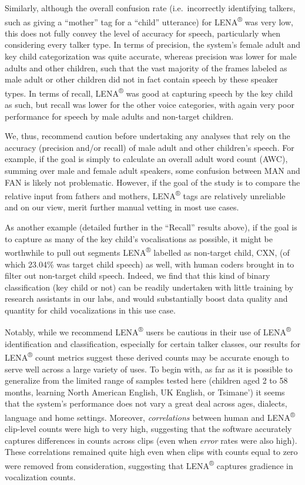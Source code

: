 \documentclass[english,table,man,floatsintext]{apa6}
\begin{document}
Similarly, although the overall confusion rate (i.e.~incorrectly
identifying talkers, such as giving a \enquote{mother} tag for a
\enquote{child} utterance) for LENA\textsuperscript{®} was very low,
this does not fully convey the level of accuracy for speech,
particularly when considering every talker type. In terms of precision,
the system's female adult and key child categorization was quite
accurate, whereas precision was lower for male adults and other
children, such that the vast majority of the frames labeled as male
adult or other children did not in fact contain speech by these speaker
types. In terms of recall, LENA\textsuperscript{®} was good at capturing
speech by the key child as such, but recall was lower for the other
voice categories, with again very poor performance for speech by male
adults and non-target children.

We, thus, recommend caution before undertaking any analyses that rely on
the accuracy (precision and/or recall) of male adult and other
children's speech. For example, if the goal is simply to calculate an
overall adult word count (AWC), summing over male and female adult
speakers, some confusion between MAN and FAN is likely not problematic.
However, if the goal of the study is to compare the relative input from
fathers and mothers, LENA\textsuperscript{®} tags are relatively
unreliable and on our view, merit further manual vetting in most use
cases.

As another example (detailed further in the \enquote{Recall} results
above), if the goal is to capture as many of the key child's
vocalisations as possible, it might be worthwhile to pull out segments
LENA\textsuperscript{®} labelled as non-target child, CXN, (of which
23.04\% was target child speech) as well, with human coders brought in
to filter out non-target child speech. Indeed, we find that this kind of
binary classification (key child or not) can be readily undertaken with
little training by research assistants in our labs, and would
substantially boost data quality and quantity for child vocalizations in
this use case.

Notably, while we recommend LENA\textsuperscript{®} users be cautious in
their use of LENA\textsuperscript{®} identification and classification,
especially for certain talker classes, our results for
LENA\textsuperscript{®} count metrics suggest these derived counts may
be accurate enough to serve well across a large variety of uses. To
begin with, as far as it is possible to generalize from the limited
range of samples tested here (children aged 2 to 58 months, learning
North American English, UK English, or Tsimane') it seems that the
system's performance does not vary a great deal across ages, dialects,
language and home settings. Moreover, \emph{correlations} between human
and LENA\textsuperscript{®} clip-level counts were high to very high,
suggesting that the software accurately captures differences in counts
across clips (even when \emph{error} rates were also high). These
correlations remained quite high even when clips with counts equal to
zero were removed from consideration, suggesting that
LENA\textsuperscript{®} captures gradience in vocalization counts.
\end{document}
